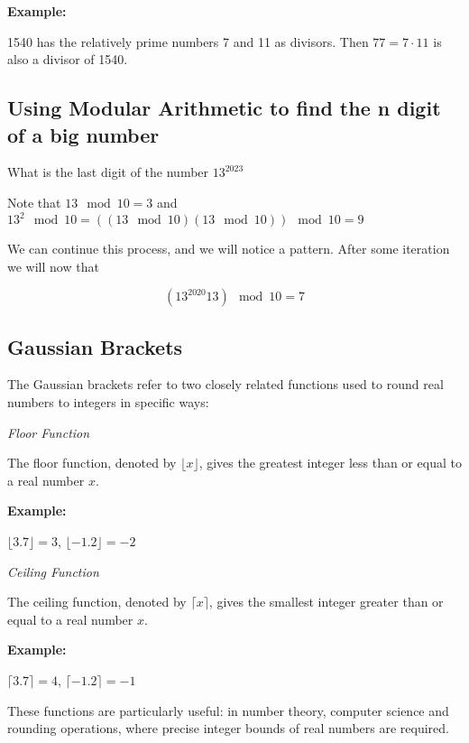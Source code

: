 \textbf{Example:}
\vspace{\baselineskip}

1540 has the relatively prime numbers 7 and 11 as divisors. Then \( 77 = 7 \cdot 11 \) is also a divisor 
of 1540.

\subsection{Using Modular Arithmetic to find the n digit of a big number}

What is the last digit of the number \(13^{2023}\)

Note that \(13 \mod 10 = 3\) and  \(13^2 \mod 10 =  ((13 \mod 10)  (13\mod 10)) \mod 10 = 9 \)

We can continue this process, and we will notice a pattern. After some iteration we will now that

\[(13^{2020} 13) \mod 10 = 7\]

\subsection{Gaussian Brackets}

The Gaussian brackets refer to two closely related functions used to round real numbers to integers 
in specific ways:

\emph{Floor Function}
\vspace{\baselineskip}

The floor function, denoted by \(\lfloor x \rfloor\), gives the greatest integer less than or equal 
to a real number \(x\). \\
\vspace{\baselineskip}
    
\textbf{Example:}
\vspace{\baselineskip}
 
\(\lfloor 3.7 \rfloor = 3\), \(\lfloor -1.2 \rfloor = -2\)

\emph{Ceiling Function} 
    
The ceiling function, denoted by \(\lceil x \rceil\), gives the smallest integer greater than or 
equal to a real number \(x\). \\
\vspace{\baselineskip}

\textbf{Example:}
\vspace{\baselineskip}
 
\(\lceil 3.7 \rceil = 4\), \(\lceil -1.2 \rceil = -1\)
\vspace{\baselineskip}

These functions are particularly useful: in number theory, computer science 
and rounding operations, where precise integer bounds of real numbers are required.

